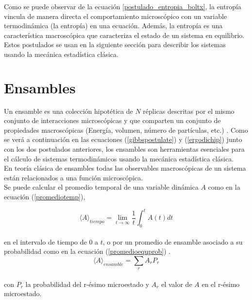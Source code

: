 Como se puede observar de la ecuación \ref{postulado_entropia_boltx}, la entropía vincula de manera directa el comportamiento microscópico con un variable termodinámica (la entropía) en una ecuación. Además, la entropía es una característica macroscópica que caracteriza el estado de un sistema en equilibrio. Estos postulados se usan en la siguiente sección para describir los sistemas usando la mecánica estadística clásica.

\section{Ensambles}

Un ensamble es una colección hipotética de $N$ réplicas descritas por el mismo conjunto de interacciones microscópicas y que comparten un conjunto de propiedades macroscópicas (Energía, volumen, número de partículas, etc.) \cite{tuckerman2010}. Como se verá a continuación en las ecuaciones (\ref{gibbspostulate}) y (\ref{ergodichip}) junto con los dos postulados anteriores, los ensambles son herramientas esenciales para el cálculo de sistemas termodinámicos usando la mecánica estadística clásica.\\

En teoría clásica de ensambles todas las observables macroscópicas de un sistema están relacionados a una función microscópica.\\

Se puede calcular el promedio temporal de una variable dinámica $A$ como en la ecuación (\ref{promediotemp}), 

\begin{equation} \label{promediotemp}
    \langle A\rangle_{tiempo} = \lim_{t\to\infty}\frac{1}{t}\int_0^t A(t)dt
\end{equation}\\
en el intervalo de tiempo de 0 a $t$,
o por un promedio de ensamble asociado a su probabilidad como en la ecuación (\ref{promedioequprob}) \cite{tuckerman2010}. \\
\begin{equation} \label{promedioequprob}
    \langle A\rangle_{ensamble} =\sum_r A_r P_r
\end{equation}\\
con $P_r$ la probabilidad del r-ésimo microestado y $A_r$ el valor de $A$ en el r-ésimo microestado.\\

